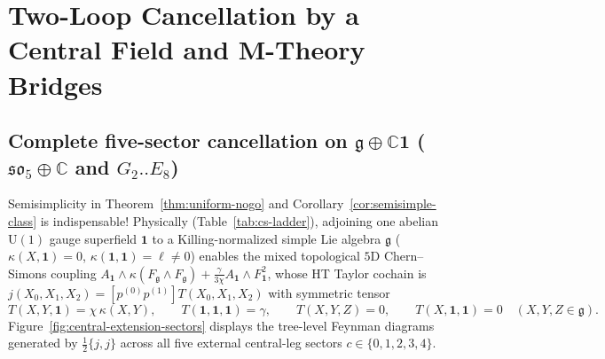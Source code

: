\documentclass[11pt,letterpaper]{article}
\numberwithin{equation}{section}
\theoremstyle{plain}
\theoremstyle{definition}
\theoremstyle{remark}
\newcommand{\fg}{\mathfrak{g}}
\newcommand{\fso}{\mathfrak{so}}
\begin{document}
\section{Two-Loop Cancellation by a Central Field and M-Theory Bridges}
\label{sec:central-moyal}

\subsection{Complete five-sector cancellation on $\fg \oplus \mathbb{C}\mathbf{1}$ ($\fso_5\oplus\mathbb{C}$ and $G_2..E_8$)}
\label{subsec:central-extension}

Semisimplicity in Theorem~\ref{thm:uniform-nogo} and Corollary~\ref{cor:semisimple-class} is indispensable! Physically (Table~\ref{tab:cs-ladder}), adjoining one abelian $\mathrm{U}(1)$ gauge superfield $\mathbf{1}$ to a Killing-normalized simple Lie algebra $\fg$ ($\kappa(X,\mathbf{1}) = 0$, $\kappa(\mathbf{1},\mathbf{1}) = \ell \neq 0$) enables the mixed topological $5\mathrm{D}$ Chern--Simons coupling $A_{\mathbf{1}}\wedge\kappa(F_{\fg}\wedge F_{\fg}) + \frac{\gamma}{3\chi}A_{\mathbf{1}}\wedge F_{\mathbf{1}}^2$, whose HT Taylor cochain is $j(X_0,X_1,X_2) = [p^{(0)}p^{(1)}]T(X_0,X_1,X_2)$ with symmetric tensor
\begin{equation}
\label{eq:central-T-def}
T(X, Y, \mathbf{1}) = \chi\,\kappa(X, Y), \qquad T(\mathbf{1}, \mathbf{1}, \mathbf{1}) = \gamma, \qquad T(X, Y, Z) = 0, \qquad T(X, \mathbf{1}, \mathbf{1}) = 0 \quad (X,Y,Z \in \fg).
\end{equation}
Figure~\ref{fig:central-extension-sectors} displays the tree-level Feynman diagrams generated by $\frac{1}{2}\{j, j\}$ across all five external central-leg sectors $c \in \{0,1,2,3,4\}$.
\end{document}
